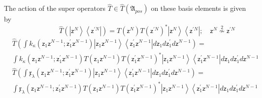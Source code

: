 \documentclass[aps,preprint]{revtex4}%
\begin{document}
The action of the super operators $\hat{T}\in\hat{T}\left(  \mathfrak{A}%
_{pos}\right)  $ on these basis elements is given by%
\begin{equation}
\qquad\qquad\qquad\qquad\hat{T}\left(  \left\vert \mathsf{z}^{N}\right\rangle
\left\langle \mathsf{z}^{\prime N}\right\vert \right)  =T\left(
\mathsf{z}^{N}\right)  T\left(  \mathsf{z}^{\prime N}\right)  ^{\ast
}\left\vert \mathsf{z}^{N}\right\rangle \left\langle \mathsf{z}^{\prime
N}\right\vert ;\quad\mathsf{z}^{N}\overset{2}{\nsim}\mathsf{z}^{\prime
N}\qquad\qquad
\end{equation}%
\begin{align}
&  \hat{T}\left(
{\displaystyle\int}
k_{\kappa}\left(  \mathsf{z}_{1}\mathsf{z}^{N-1};\mathsf{z}_{1}^{\prime
}\mathsf{z}^{N-1}\right)  \left\vert \mathsf{z}_{1}\mathsf{z}^{N-1}%
\right\rangle \left\langle \mathsf{z}_{1}^{\prime}\mathsf{z}^{N-1}\right\vert
d\mathsf{z}_{1}d\mathsf{z}_{1}^{\prime}d\mathsf{z}^{N-1}\right)  =\nonumber\\
&
{\displaystyle\int}
k_{\kappa}\left(  \mathsf{z}_{1}\mathsf{z}^{N-1};\mathsf{z}_{1}^{\prime
}\mathsf{z}^{N-1}\right)  T\left(  \mathsf{z}_{1}\mathsf{z}^{N-1}\right)
T\left(  \mathsf{z}_{1}^{\prime}\mathsf{z}^{N-1}\right)  ^{\ast}\left\vert
\mathsf{z}_{1}\mathsf{z}^{N-1}\right\rangle \left\langle \mathsf{z}%
_{1}^{\prime}\mathsf{z}^{N-1}\right\vert d\mathsf{z}_{1}d\mathsf{z}%
_{1}^{\prime}d\mathsf{z}^{N-1}%
\end{align}%
\begin{align}
&  \hat{T}\left(
{\displaystyle\int}
\mathfrak{x}_{\lambda}\left(  \mathsf{z}_{1}\mathsf{z}^{N-1};\mathsf{z}%
_{1}^{\prime}\mathsf{z}^{N-1}\right)  \left\vert \mathsf{z}_{1}\mathsf{z}%
^{N-1}\right\rangle \left\langle \mathsf{z}_{1}^{\prime}\mathsf{z}%
^{N-1}\right\vert d\mathsf{z}_{1}d\mathsf{z}_{1}^{\prime}d\mathsf{z}%
^{N-1}\right)  =\nonumber\\
&
{\displaystyle\int}
\mathfrak{x}_{\lambda}\left(  \mathsf{z}_{1}\mathsf{z}^{N-1};\mathsf{z}%
_{1}^{\prime}\mathsf{z}^{N-1}\right)  T\left(  \mathsf{z}_{1}\mathsf{z}%
^{N-1}\right)  T\left(  \mathsf{z}_{1}^{\prime}\mathsf{z}^{N-1}\right)
^{\ast}\left\vert \mathsf{z}_{1}\mathsf{z}^{N-1}\right\rangle \left\langle
\mathsf{z}_{1}^{\prime}\mathsf{z}^{N-1}\right\vert d\mathsf{z}_{1}%
d\mathsf{z}_{1}^{\prime}d\mathsf{z}^{N-1}%
\end{align}
\end{document}
